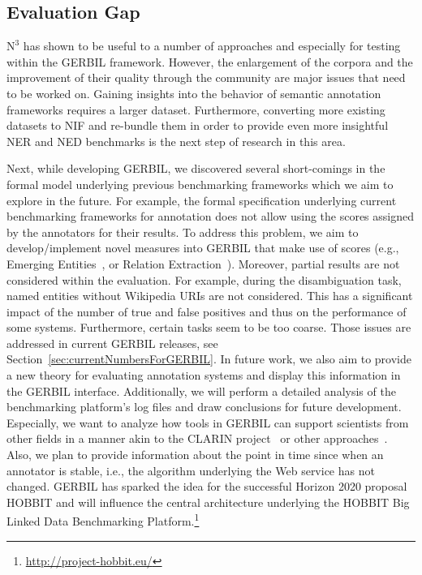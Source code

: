 \subsection*{Evaluation Gap}

$\mbox{N}^3$ has shown to be useful to a number of approaches and especially for testing within the GERBIL framework. 
However, the enlargement of the corpora and the improvement of their quality through the community are major issues that need to be worked on. 
Gaining insights into the behavior of semantic annotation frameworks requires a larger dataset.
Furthermore, converting more existing datasets to NIF and re-bundle them in order to provide even more insightful NER and NED benchmarks is the next step of research in this area.


Next, while developing GERBIL, we discovered several short-comings in the formal model underlying previous benchmarking frameworks which we aim to explore in the future. 
For example, the formal specification underlying current benchmarking frameworks for annotation does not allow using the scores assigned by the annotators for their results. 
To address this problem, we aim to develop/implement novel measures into GERBIL that make use of scores (e.g., Emerging Entities~\cite{Hoffart:2014:DEE:2566486.2568003}, or Relation Extraction~\cite{DBLP:series/sci/Heyer12}).
Moreover, partial results are not considered within the evaluation. 
For example, during the disambiguation task, named entities without Wikipedia URIs are not considered. 
This has a significant impact of the number of true and false positives and thus on the performance of some systems.
Furthermore, certain tasks seem to be too coarse. 
Those issues are addressed in current GERBIL releases, see Section~\ref{sec:currentNumbersForGERBIL}. 
In future work, we also aim to provide a new theory for evaluating annotation systems and display this information in the GERBIL interface.
Additionally, we will perform a detailed analysis of the benchmarking platform's log files and draw conclusions for future development.
Especially, we want to analyze how tools in GERBIL can support scientists from other fields in a manner akin to the CLARIN project~\cite{DBLP:journals/it/BoehlkeHW13} or other approaches~\cite{heyer2006text}.
Also, we plan to provide information about the point in time since when an annotator is stable, i.e., the algorithm underlying the Web service has not changed.
GERBIL has sparked the idea for the successful Horizon 2020 proposal HOBBIT and will influence the central architecture underlying the HOBBIT Big Linked Data Benchmarking Platform.\footnote{\url{http://project-hobbit.eu/}} 


